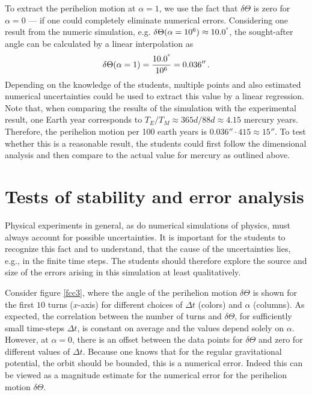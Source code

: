 \documentclass[12pt,ngerman,american]{iopart}
\begin{document}
To extract the perihelion motion at $\alpha = 1$, we use the fact that $\delta \Theta$ is zero for $\alpha =0$ --- if one could completely eliminate numerical errors.
Considering one result from the numeric simulation, e.g. $\delta\Theta(\alpha = 10^6) \approx 10.0^{\degree}$, the sought-after angle can be calculated by a linear interpolation as
\begin{equation}
	\delta\Theta (\alpha=1) = \frac{10.0^{\degree}}{10^6} = 0.036''
	\, .
\end{equation}
Depending on the knowledge of the students, multiple points and also estimated numerical uncertainties could be used to extract this value by a linear regression.
Note that, when comparing the results of the simulation with the experimental result, one Earth year corresponds to $T_E/T_M \approx 365d/88d\approx 4.15$ mercury years.
Therefore, the perihelion motion per 100 earth years is $0.036''\cdot 415\approx 15''$.
To test whether this is a reasonable result, the students could first follow the dimensional analysis and then compare to the actual value for mercury as outlined above.

\section{Tests of stability and error analysis}\label{sec:stability}
Physical experiments in general, as do numerical simulations of physics, must always account for possible uncertainties.
It is important for the students to recognize this fact and to understand, that the cause of the uncertainties lies, e.g., in the finite time steps.
The students should therefore explore the source and size of the errors arising in this simulation at least qualitatively.

Consider figure \ref{fcc3}, where the angle of the perihelion motion $\delta \Theta$ is shown for the first $10$ turns ($x$-axis) for different choices of $\Delta t$ (colors) and $\alpha$ (columns).
As expected, the correlation between the number of turns and $\delta\Theta$, for sufficiently small time-steps $\Delta t$, is constant on average and the values depend solely on $\alpha$.
However, at $\alpha=0$, there is an offset between the data points for $\delta \Theta$ and zero for different values of $\Delta t$.
Because one knows that for the regular gravitational potential, the orbit should be bounded, this is a numerical error.
Indeed this can be viewed as a magnitude estimate for the numerical error for the perihelion motion $\delta \Theta$.
\end{document}
